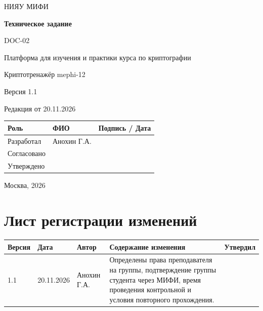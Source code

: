 \documentclass[12pt,a4paper]{article}
\begin{document}
\hypersetup{pageanchor=false}
\begin{titlepage}
  \thispagestyle{empty}
  \centering
  {\large НИЯУ МИФИ\par}
  \vspace*{3.5cm}
  {\LARGE\bfseries Техническое задание\par}
  \vspace{0.5cm}
  {\large DOC-02\par}
  \vspace{0.6cm}
  {\large Платформа для изучения и практики курса по криптографии\par}
  {\large Криптотренажёр mephi-12\par}
  \vspace{0.7cm}
  {\large Версия 1.1\par}
  {\large Редакция от 20.11.2026\par}
  \vspace{1cm}
  \begin{tabularx}{\textwidth}{@{}p{3.4cm}Xp{4cm}@{}}
    \toprule
    Роль & ФИО & Подпись / Дата \\
    \midrule
    Разработал & Анохин Г.А. & \\
    \addlinespace[6pt]
    Согласовано & & \\
    \addlinespace[6pt]
    Утверждено & & \\
    \bottomrule
  \end{tabularx}
  \vfill
  {\large Москва, 2026\par}
\end{titlepage}
\hypersetup{pageanchor=true}

\section*{Лист регистрации изменений}
\begingroup\small\singlespacing
\noindent
\begin{tabularx}{\textwidth}{@{}p{1.2cm}p{2cm}p{2.5cm}Xp{1.8cm}@{}}
\toprule
Версия & Дата & Автор & Содержание изменения & Утвердил \\
\midrule
1.1 & 20.11.2026 & Анохин Г.А. & Определены права преподавателя на группы, подтверждение группы студента через МИФИ, время проведения контрольной и условия повторного прохождения. & \\
\bottomrule
\end{tabularx}
\endgroup
\clearpage
\begingroup\small\singlespacing
\tableofcontents
\endgroup
\clearpage
\end{document}
